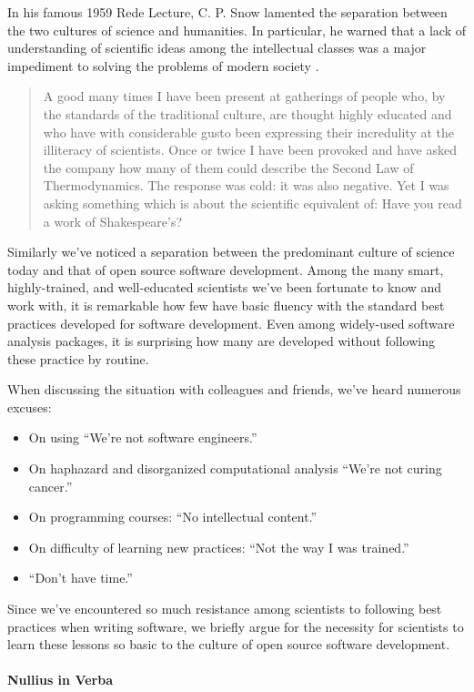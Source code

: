 \documentclass[ChapterTOCs,krantz2]{krantz} %
\begin{document}
In his famous 1959 Rede Lecture, C. P. Snow lamented the separation between the
two cultures of science and humanities.  In particular, he warned that a lack
of understanding of scientific ideas among the intellectual classes was a major
impediment to solving the problems of modern society \cite{snow1960two}.

\begin{quote}
A good many times I have been present at gatherings of people who, by the
standards of the traditional culture, are thought highly educated and who have
with considerable gusto been expressing their incredulity at the illiteracy of
scientists. Once or twice I have been provoked and have asked the company how
many of them could describe the Second Law of Thermodynamics. The response was
cold: it was also negative. Yet I was asking something which is about the
scientific equivalent of: Have you read a work of Shakespeare’s?
\end{quote}

Similarly we've noticed a separation between the predominant culture of
science today and that of open source software development. Among the
many smart, highly-trained, and well-educated scientists we've been
fortunate to know and work with, it is remarkable how few have basic
fluency with the standard best practices developed for software development.
Even among widely-used software analysis packages, it is surprising how
many are developed without following these practice by routine.

When discussing the situation with colleagues and friends, we've heard numerous
excuses:
\begin{itemize}
\item On using ``We're not software engineers.''
\item On haphazard and disorganized computational analysis ``We're not curing cancer.''
\item On programming courses: ``No intellectual content.''
\item On difficulty of learning new practices: ``Not the way I was trained.''
\item ``Don't have time.''
\end{itemize}

Since we've encountered so much resistance among scientists to following best
practices when writing software, we briefly argue for the necessity for
scientists to learn these lessons so basic to the culture of open source
software development.

\paragraph{ {\bf Nullius in Verba}} 
\end{document}
